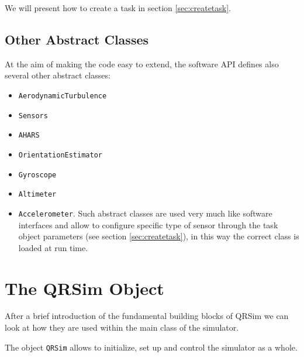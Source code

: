 \documentclass[a4paper,11pt]{report}
\newcommand{\sname}{QRSim\xspace}
\newcommand{\snamettt}{\texttt{QRSim}\xspace}
\begin{document}
We will present how to create a task in section \ref{sec:createtask}.

\subsection{Other Abstract Classes}

At the aim of making the code easy to extend, the software API defines also several other abstract classes:
\begin{itemize}
\item \texttt{AerodynamicTurbulence}
\item \texttt{Sensors}
\item \texttt{AHARS}
\item \texttt{OrientationEstimator}
\item \texttt{Gyroscope}
\item \texttt{Altimeter}
\item \texttt{Accelerometer}.
Such abstract classes are used very much like software interfaces and allow to configure specific type of sensor through the task object parameters (see section \ref{sec:createtask}), in this way the correct class is loaded at run time.
\end{itemize}

\section{The \sname Object}\label{sec:qrobj}

After a brief introduction of the fundamental building blocks of \sname we can look at how they are used within the main class of the simulator. 

The object \snamettt allows to initialize, set up and control the simulator as a whole. 
\end{document}
